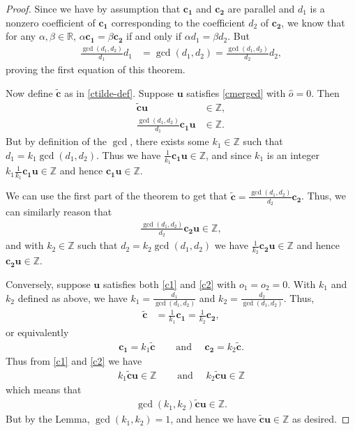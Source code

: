 \documentclass[11pt]{article}
\newcommand{\vect}[1]{\mathbf{#1}}
\begin{document}
\begin{proof}
Since we have by assumption that $\vect{c_1}$ and $\vect{c_2}$ are parallel and $d_1$ is a nonzero coefficient of $\vect{c_1}$ corresponding to the coefficient $d_2$ of $\vect{c_2}$, we know that for any $\alpha, \beta\in\mathbb{R}$, $\alpha \vect{c_1} = \beta \vect{c_2}$ if and only if $\alpha d_1 = \beta d_2$. But
\begin{align*}
\frac{\gcd(d_1, d_2)}{d_1} d_1 &= \gcd(d_1, d_2) = \frac{\gcd(d_1, d_2)}{d_2} d_2,
\end{align*}
proving the first equation of this theorem.

Now define $\widetilde{\vect{c}}$ as in \eqref{ctilde-def}. Suppose $\vect{u}$ satisfies \eqref{cmerged} with $\widehat{o} = 0$. Then
\begin{align*}
\widetilde{\vect{c}} \vect{u} &\in \mathbb{Z}, \\
\frac{\gcd(d_1, d_2)}{d_1} \vect{c_1} \vect{u} &\in \mathbb{Z}.
\end{align*}
But by definition of the $\gcd$, there exists some $k_1\in \mathbb{Z}$ such that $d_1 = k_1 \gcd(d_1, d_2)$. Thus we have $\frac{1}{k_1}\vect{c_1} \vect{u} \in \mathbb{Z}$, and since $k_1$ is an integer $k_1 \frac{1}{k_1}\vect{c_1}\vect{u}\in\mathbb{Z}$ and hence $\vect{c_1}\vect{u}\in\mathbb{Z}$.

We can use the first part of the theorem to get that $\widetilde{\vect{c}} = \frac{\gcd(d_1, d_2)}{d_2}\vect{c_2}$. Thus, we can similarly reason that
\begin{align*}
\frac{\gcd(d_1, d_2)}{d_2}\vect{c_2}\vect{u} \in \mathbb{Z},
\end{align*}
and with $k_2\in\mathbb{Z}$ such that $d_2 = k_2 \gcd(d_1, d_2)$ we have $\frac{1}{k_2}\vect{c_2}\vect{u}\in\mathbb{Z}$ and hence $\vect{c_2}\vect{u}\in\mathbb{Z}$.

Conversely, suppose $\vect{u}$ satisfies both \eqref{c1} and \eqref{c2} with $o_1 = o_2 = 0$. With $k_1$ and $k_2$ defined as above, we have $k_1 = \frac{d_1}{\gcd(d_1, d_2)}$ and $k_2 = \frac{d_2}{\gcd(d_1,d_2)}$. Thus,
\begin{align*}
\widetilde{\vect{c}} &= \frac{1}{k_1} \vect{c_1} = \frac{1}{k_2}\vect{c_2},
\end{align*}
or equivalently
\begin{align*}
\vect{c_1} = k_1\widetilde{\vect{c}} \quad&\text{ and }\quad \vect{c_2} = k_2 \widetilde{\vect{c}}.
\end{align*}
Thus from \eqref{c1} and \eqref{c2} we have
\begin{align*}
k_1\widetilde{\vect{c}}\vect{u}\in\mathbb{Z} \quad&\text{ and }\quad k_2\widetilde{\vect{c}}\vect{u}\in\mathbb{Z} 
\end{align*}
which means that 
\begin{align*}
\gcd(k_1, k_2) \widetilde{\vect{c}}\vect{u} \in \mathbb{Z}.
\end{align*}
But by the Lemma, $\gcd(k_1, k_2) = 1$, and hence we have $\widetilde{\vect{c}}\vect{u}\in\mathbb{Z}$ as desired.
\end{proof}
\end{document}
